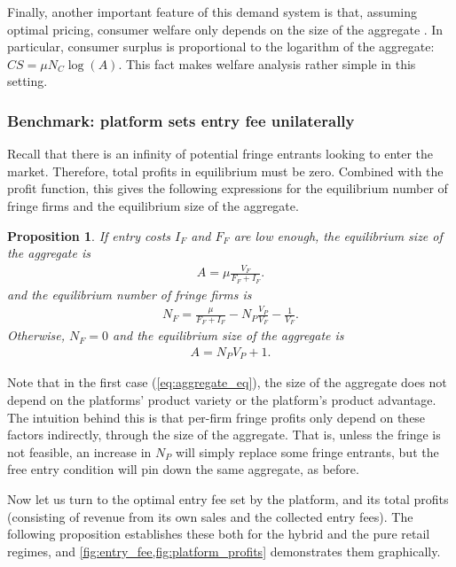 \documentclass[a4paper]{article}
\newtheorem{proposition}{Proposition}
\begin{document}
Finally, another important feature of this demand system is that, assuming optimal pricing, consumer welfare only depends on the size of the aggregate \parencite{anderson2020aggregative}.
In particular, consumer surplus is proportional to the logarithm of the aggregate: $CS = \mu N_C \log(A)$. This fact makes welfare analysis rather simple in this setting.

\subsubsection{Benchmark: platform sets entry fee unilaterally}

Recall that there is an infinity of potential fringe entrants looking to enter the market.
Therefore, total profits in equilibrium must be zero.
Combined with the  profit function, this gives the following expressions for the equilibrium number of fringe firms and the equilibrium size of the aggregate.
\begin{proposition}
    \label{prop:equilibrium_aggregate}
    If entry costs $I_F$ and $F_F$ are low enough, the equilibrium size of the aggregate is
    \begin{align}
        A = \mu \frac{V_F}{F_F + I_F}.
        \label{eq:aggregate_eq}
    \end{align}
    and the equilibrium number of fringe firms is
    \begin{align*}
        N_F = \frac{\mu}{F_F + I_F} - N_P \frac{V_P}{V_F} - \frac{1}{V_F}.
    \end{align*}
    Otherwise,  $N_F = 0$ and the equilibrium size of the aggregate is
    \begin{align*}
        A = N_P V_P + 1.
    \end{align*}
\end{proposition}
Note that in the first case (\cref{eq:aggregate_eq}), the size of the aggregate does not depend on the platforms' product variety or the platform's product advantage.
The intuition behind this is that per-firm fringe profits only depend on these factors indirectly, through the size of the aggregate.
That is, unless the fringe is not feasible, an increase in $N_P$ will simply replace some fringe entrants, but the free entry condition will pin down the same aggregate, as before.

Now let us turn to the optimal entry fee set by the platform, and its total profits (consisting of revenue from its own sales and the collected entry fees).
The following proposition establishes these both for the hybrid and the pure retail regimes, and \cref{fig:entry_fee,fig:platform_profits} demonstrates them graphically.
\end{document}
